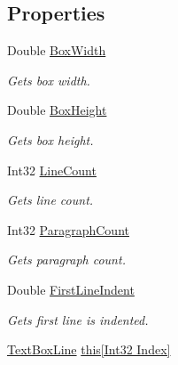 \subsection*{Properties}
\begin{DoxyCompactItemize}
\item 
Double \hyperlink{class_pdf_file_writer_1_1_text_box_a34a203840d14e36e0ae0d80b3c2ee1c7}{Box\+Width}
\begin{DoxyCompactList}\small\item\em Gets box width. \end{DoxyCompactList}\item 
Double \hyperlink{class_pdf_file_writer_1_1_text_box_af6b6dfaca0fb5e313ac4e2dd7a3e658c}{Box\+Height}
\begin{DoxyCompactList}\small\item\em Gets box height. \end{DoxyCompactList}\item 
Int32 \hyperlink{class_pdf_file_writer_1_1_text_box_a3ff5e10810b57c0b6c7b989913b5cebb}{Line\+Count}
\begin{DoxyCompactList}\small\item\em Gets line count. \end{DoxyCompactList}\item 
Int32 \hyperlink{class_pdf_file_writer_1_1_text_box_a865eb68abe1b2d517c02ee4db0a8bb9e}{Paragraph\+Count}
\begin{DoxyCompactList}\small\item\em Gets paragraph count. \end{DoxyCompactList}\item 
Double \hyperlink{class_pdf_file_writer_1_1_text_box_a2fb4e8a5bcb730df655e813fe5fd2cf1}{First\+Line\+Indent}
\begin{DoxyCompactList}\small\item\em Gets first line is indented. \end{DoxyCompactList}\item 
\hyperlink{class_pdf_file_writer_1_1_text_box_line}{Text\+Box\+Line} \hyperlink{class_pdf_file_writer_1_1_text_box_af34acbe1db9d16383f247db5f3354402}{this\mbox{[}\+Int32 Index\mbox{]}}

\end{DoxyCompactItemize}

